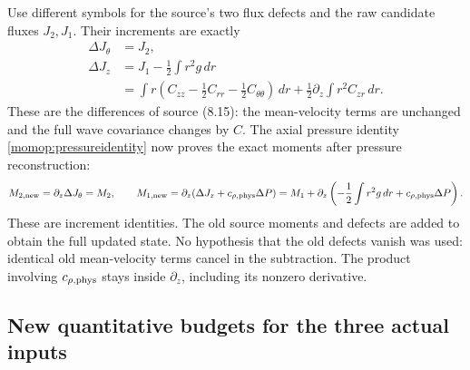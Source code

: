 Use different symbols for the source's two flux defects and the raw
candidate fluxes $J_2,J_1$. Their increments are exactly
\begin{align}
 \Delta J_\theta&=J_2,\nonumber\\
 \Delta J_z&=J_1-\frac12\int r^2g\,dr\nonumber\\
 &=\int r\left(C_{zz}-\frac12C_{rr}
                         -\frac12C_{\theta\theta}\right)\,dr
                    +\frac12\partial_z\int r^2C_{zr}\,dr .
 \label{momop:defectdictionary}
\end{align}
These are the differences of source (8.15): the mean-velocity terms
are unchanged and the full wave covariance changes by $C$.
The axial pressure identity \eqref{momop:pressureidentity} now proves
the exact moments after pressure reconstruction:
\begin{equation}\label{momop:afterpressure}
 M_{2,\rm new}=\partial_z\Delta J_\theta=M_2,\qquad
 M_{1,\rm new}=\partial_z(\Delta J_z+c_{\rho,\rm phys}\Delta P)
  =M_1+\partial_z\left(-\frac12\int r^2g\,dr
                                      +c_{\rho,\rm phys}\Delta P\right).
\end{equation}
These are increment identities. The old source moments and defects
are added to obtain the full updated state. No hypothesis that the
old defects vanish was used: identical old mean-velocity terms
cancel in the subtraction. The product involving $c_{\rho,\rm phys}$
stays inside $\partial_z$, including its nonzero derivative.

\subsection{New quantitative budgets for the three actual inputs}

